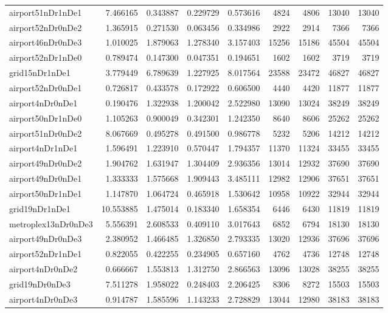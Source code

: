 \begin{longtable}{|l|r|r|r|r|r|r|r|r|}
airport51nDr1nDe1 & 7.466165 & 0.343887 & 0.229729 & 0.573616 & 4824 & 4806 & 13040 & 13040 \\
airport52nDr0nDe2 & 1.365915 & 0.271530 & 0.063456 & 0.334986 & 2922 & 2914 & 7366 & 7366 \\
airport46nDr0nDe3 & 1.010025 & 1.879063 & 1.278340 & 3.157403 & 15256 & 15186 & 45504 & 45504 \\
airport52nDr1nDe0 & 0.789474 & 0.147300 & 0.047351 & 0.194651 & 1602 & 1602 & 3719 & 3719 \\
grid15nDr1nDe1 & 3.779449 & 6.789639 & 1.227925 & 8.017564 & 23588 & 23472 & 46827 & 46827 \\
airport52nDr0nDe1 & 0.726817 & 0.433578 & 0.172922 & 0.606500 & 4440 & 4420 & 11877 & 11877 \\
airport4nDr0nDe1 & 0.190476 & 1.322938 & 1.200042 & 2.522980 & 13090 & 13024 & 38249 & 38249 \\
airport50nDr1nDe0 & 1.105263 & 0.900049 & 0.342301 & 1.242350 & 8640 & 8606 & 25262 & 25262 \\
airport51nDr0nDe2 & 8.067669 & 0.495278 & 0.491500 & 0.986778 & 5232 & 5206 & 14212 & 14212 \\
airport4nDr1nDe1 & 1.596491 & 1.223910 & 0.570447 & 1.794357 & 11370 & 11324 & 33455 & 33455 \\
airport49nDr0nDe2 & 1.904762 & 1.631947 & 1.304409 & 2.936356 & 13014 & 12932 & 37690 & 37690 \\
airport49nDr0nDe1 & 1.333333 & 1.575668 & 1.909443 & 3.485111 & 12982 & 12906 & 37651 & 37651 \\
airport50nDr1nDe1 & 1.147870 & 1.064724 & 0.465918 & 1.530642 & 10958 & 10922 & 32944 & 32944 \\
grid19nDr1nDe1 & 10.553885 & 1.475014 & 0.183340 & 1.658354 & 6446 & 6430 & 11819 & 11819 \\
metroplex13nDr0nDe3 & 5.556391 & 2.608533 & 0.409110 & 3.017643 & 6852 & 6794 & 18130 & 18130 \\
airport49nDr0nDe3 & 2.380952 & 1.466485 & 1.326850 & 2.793335 & 13020 & 12936 & 37696 & 37696 \\
airport52nDr1nDe1 & 0.822055 & 0.422255 & 0.234905 & 0.657160 & 4762 & 4736 & 12748 & 12748 \\
airport4nDr0nDe2 & 0.666667 & 1.553813 & 1.312750 & 2.866563 & 13096 & 13028 & 38255 & 38255 \\
grid19nDr0nDe3 & 7.511278 & 1.958022 & 0.248403 & 2.206425 & 8306 & 8272 & 15503 & 15503 \\
airport4nDr0nDe3 & 0.914787 & 1.585596 & 1.143233 & 2.728829 & 13044 & 12980 & 38183 & 38183 \\

\end{longtable}
